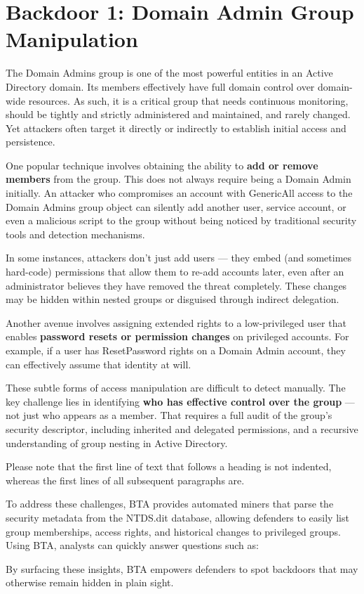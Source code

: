 \section{Backdoor 1: Domain Admin Group Manipulation}

The Domain Admins group is one of the most powerful entities in an Active Directory domain. Its members effectively have full domain control over domain-wide resources. As such, it is a critical group that needs continuous monitoring, should be tightly and strictly administered and maintained, and rarely changed. Yet attackers often target it directly or indirectly to establish initial access and persistence.

One popular technique involves obtaining the ability to \textbf{add or remove members} from the group. This does not always require being a Domain Admin initially. An attacker who compromises an account with GenericAll access to the Domain Admins group object can silently add another user, service account, or even a malicious script to the group without being noticed by traditional security tools and detection mechanisms.

In some instances, attackers don't just add users — they embed (and sometimes hard-code) permissions that allow them to re-add accounts later, even after an administrator believes they have removed the threat completely. These changes may be hidden within nested groups or disguised through indirect delegation.

Another avenue involves assigning extended rights to a low-privileged user that enables \textbf{password resets or permission changes} on privileged accounts. For example, if a user has ResetPassword rights on a Domain Admin account, they can effectively assume that identity at will.

These subtle forms of access manipulation are difficult to detect manually. The key challenge lies in identifying \textbf{who has effective control over the group} — not just who appears as a member. That requires a full audit of the group's security descriptor, including inherited and delegated permissions, and a recursive understanding of group nesting in Active Directory.

Please note that the first line of text that follows a heading is not indented, whereas the first lines of all subsequent paragraphs are.

To address these challenges, BTA provides automated miners that parse the security metadata from the NTDS.dit database, allowing defenders to easily list group memberships, access rights, and historical changes to privileged groups. Using BTA, analysts can quickly answer questions such as:

By surfacing these insights, BTA empowers defenders to spot backdoors that may otherwise remain hidden in plain sight.
